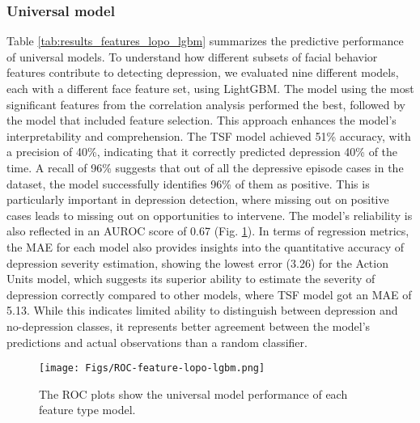 \subsubsection{Universal model}
Table \ref{tab:results_features_lopo_lgbm} summarizes the predictive performance of universal models. To understand how different subsets of facial behavior features contribute to detecting depression, we evaluated nine different models, each with a different face feature set, using LightGBM. The model using the most significant features from the correlation analysis performed the best, followed by the model that included feature selection. This approach enhances the model's interpretability and comprehension. The TSF model achieved 51\% accuracy, with a precision of 40\%, indicating that it correctly predicted depression 40\% of the time. A recall of 96\% suggests that out of all the depressive episode cases in the dataset, the model successfully identifies 96\% of them as positive. This is particularly important in depression detection, where missing out on positive cases leads to missing out on opportunities to intervene. The model's reliability is also reflected in an AUROC score of 0.67 (Fig. \ref{fig:roc_features_lopo_lgbm}). In terms of regression metrics, the MAE for each model also provides insights into the quantitative accuracy of depression severity estimation, showing the lowest error (3.26) for the Action Units model, which suggests its superior ability to estimate the severity of depression correctly compared to other models, where TSF model got an MAE of 5.13. While this indicates limited ability to distinguish between depression and no-depression classes, it represents better agreement between the model's predictions and actual observations than a random classifier.

\begin{figure}[h]
    \texttt{[image: Figs/ROC-feature-lopo-lgbm.png]}
    \caption{The ROC plots show the universal model performance of each feature type model.}
    \label{fig:roc_features_lopo_lgbm}
\end{figure}

